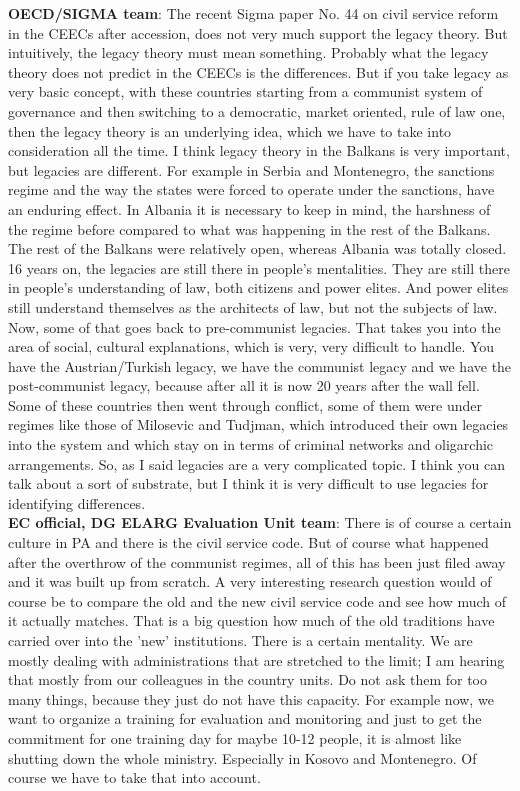 \textbf{OECD/SIGMA team}: The recent Sigma paper No. 44 on civil service reform in the CEECs after accession, does not very much support the legacy theory. But intuitively, the legacy theory must mean something. Probably what the legacy theory does not predict in the CEECs is the differences. But if you take legacy as very basic concept, with these countries starting from a communist system of governance and then switching to a democratic, market oriented, rule of law one, then the legacy theory is an underlying idea, which we have to take into consideration all the time. I think legacy theory in the Balkans is very important, but legacies are different. For example in Serbia and Montenegro, the sanctions regime and the way the states were forced to operate under the sanctions, have an enduring effect. In Albania it is necessary to keep in mind, the harshness of the regime before compared to what was happening in the rest of the Balkans. The rest of the Balkans were relatively open, whereas Albania was totally closed. 16 years on, the legacies are still there in people's mentalities. They are still there in people's understanding of law, both citizens and power elites. And power elites still understand themselves as the architects of law, but not the subjects of law. Now, some of that goes back to pre-communist legacies. That takes you into the area of social, cultural explanations, which is very, very difficult to handle. You have the Austrian/Turkish legacy, we have the communist legacy and we have the post-communist legacy, because after all it is now 20 years after the wall fell. Some of these countries then went through conflict, some of them were under regimes like those of Milosevic and Tudjman, which introduced their own legacies into the system and which stay on in terms of criminal networks and oligarchic arrangements. So, as I said legacies are a very complicated topic. I think you can talk about a sort of substrate, but I think it is very difficult to use legacies for identifying differences. \\
\textbf{EC official, DG ELARG Evaluation Unit team}: There is of course a certain culture in PA and there is the civil service code. But of course what happened after the overthrow of the communist regimes, all of this has been just filed away and it was built up from scratch. A very interesting research question would of course be to compare the old and the new civil service code and see how much of it actually matches. That is a big question how much of the old traditions have carried over into the 'new' institutions. There is a certain mentality. We are mostly dealing with administrations that are stretched to the limit; I am hearing that mostly from our colleagues in the country units. Do not ask them for too many things, because they just do not have this capacity. For example now, we want to organize a training for evaluation and monitoring and just to get the commitment for one training day for maybe 10-12 people, it is almost like shutting down the whole ministry. Especially in Kosovo and Montenegro. Of course we have to take that into account. \\
